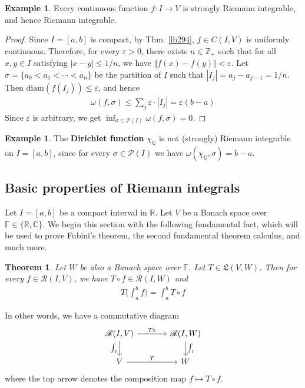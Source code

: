 \documentclass[12pt,b5paper,notitlepage]{article}
\theoremstyle{definition}
\newtheorem{eg}[df]{Example}
\theoremstyle{plain}
\newtheorem{thm}[df]{Theorem}
\newcommand{\fk}{\mathfrak}
\newcommand{\mc}{\mathcal}
\newcommand{\scr}{\mathscr}
\newcommand{\Cbb}{\mathbb C}
\newcommand{\Zbb}{\mathbb Z}
\newcommand{\Qbb}{\mathbb Q}
\newcommand{\Rbb}{\mathbb R}
\newcommand{\Fbb}{\mathbb F}
\newcommand{\diam}{\mathrm{diam}}
\newcommand{\eps}{\varepsilon}
\numberwithin{equation}{section}
\begin{document}
\begin{eg}\label{lb377}
Every continuous function $f:I\rightarrow V$ is strongly Riemann integrable, and hence Riemann integrable.
\end{eg}


\begin{proof}
Since $I=[a,b]$ is compact, by Thm. \ref{lb294}, $f\in C(I,V)$ is uniformly continuous. Therefore, for every $\eps>0$, there exists $n\in\Zbb_+$ such that for all $x,y\in I$ satisfying $|x-y|\leq 1/n$, we have $\Vert f(x)-f(y)\Vert<\eps$. Let $\sigma=\{a_0<a_1<\cdots<a_n\}$ be the partition of $I$ such that $|I_j|=a_j-a_{j-1}=1/n$. Then $\diam(f(I_j))\leq\eps$, and hence
\begin{align*}
\omega(f,\sigma)\leq\sum_j \eps\cdot|I_j|=\eps(b-a)
\end{align*}
Since $\eps$ is arbitrary, we get $\inf_{\sigma\in\mc P(I)} \omega(f,\sigma)=0$.
\end{proof}


\begin{eg}
The \textbf{Dirichlet function} $\chi_\Qbb$ is not (strongly) Riemann integrable on $I=[a,b]$, since for every $\sigma\in\mc P(I)$ we have $\omega(\chi_\Qbb,\sigma)=b-a$.
\end{eg}




\subsection{Basic properties of Riemann integrals}


Let $I=[a,b]$ be a compact interval in $\Rbb$. Let $V$ be a Banach space over $\Fbb\in\{\Rbb,\Cbb\}$. We begin this section with the following fundamental fact, which will be used to prove Fubini's theorem, the second fundamental theorem calculus, and much more.


\begin{thm}\label{lb392}
Let $W$ be also a Banach space over $\Fbb$. Let $T\in\fk L(V,W)$. Then for every $f\in\scr R(I,V)$, we have $T\circ f\in\scr R(I,W)$ and
\begin{align}
T\Big(\int_a^b f \Big)=\int_a^b T\circ f
\end{align}
\end{thm}

In other words, we have a commutative diagram
\begin{equation}\label{eq166}
\begin{tikzcd}[column sep=large]
\scr R(I,V) \arrow[r,"T\circ"] \arrow[d,"\int_I"'] & \scr R(I,W) \arrow[d,"\int_I"] \\
V \arrow[r,"T"]           & W        
\end{tikzcd} 
\end{equation}
where the top arrow denotes the composition map $f\mapsto T\circ f$. 
\end{document}
